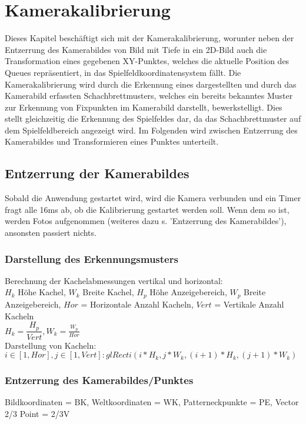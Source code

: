 \section{Kamerakalibrierung}

Dieses Kapitel beschäftigt sich mit der Kamerakalibrierung, worunter neben der Entzerrung des Kamerabildes von Bild mit Tiefe in ein 2D-Bild auch die Transformation eines gegebenen XY-Punktes, welches die aktuelle Position des Queues repräsentiert, in das Spielfeldkoordinatensystem fällt.
Die Kamerakalibrierung wird durch die Erkennung eines dargestellten und durch das Kamerabild erfassten Schachbrettmusters, welches ein bereits bekanntes Muster zur Erkennung von Fixpunkten im Kamerabild darstellt, bewerkstelligt. Dies stellt gleichzeitig die Erkennung des Spielfeldes dar, da das Schachbrettmuster auf dem Spielfeldbereich angezeigt wird. Im Folgenden wird zwischen Entzerrung des Kamerabildes und Transformieren eines Punktes unterteilt.

\subsection{Entzerrung der Kamerabildes}

Sobald die Anwendung gestartet wird, wird die Kamera verbunden und ein Timer fragt alle 16ms ab, ob die Kalibrierung gestartet werden soll. Wenn dem so ist, werden Fotos aufgenommen (weiteres dazu s. 'Entzerrung des Kamerabildes'), ansonsten passiert nichts.

\subsubsection{Darstellung des Erkennungsmusters}

Berechnung der Kachelabmessungen vertikal und horizontal:\\
$H_{k}$ Höhe Kachel, $W_{k}$ Breite Kachel, $H_{p}$ Höhe Anzeigebereich, $W_{p}$ Breite Anzeigebereich, $Hor$ = Horizontale Anzahl Kacheln, $Vert$ = Vertikale Anzahl Kacheln\\
$H_{k} = \dfrac{H_{p}}{Vert}, W_{k} = \frac{W_{p}}{Hor}$\\

Darstellung von Kacheln:\\
$i \in [1,Hor], j \in [1,Vert] : glRecti( i*H_{k}, j*W_{k}, (i+1)*H_{k}, (j+1)*W_{k} )$

\subsubsection{Entzerrung des Kamerabildes/Punktes}
Bildkoordinaten = BK, Weltkoordinaten = WK, Patterneckpunkte = PE, Vector 2/3 Point = 2/3V\\



